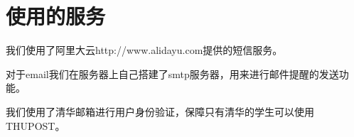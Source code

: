 \section{使用的服务}
我们使用了阿里大云http://www.alidayu.com提供的短信服务。

对于email我们在服务器上自己搭建了smtp服务器，用来进行邮件提醒的发送功能。

我们使用了清华邮箱进行用户身份验证，保障只有清华的学生可以使用THUPOST。
